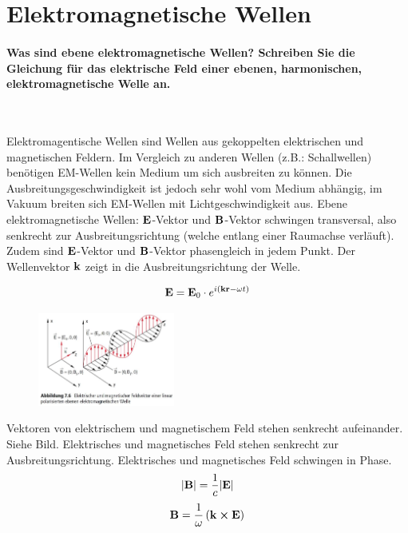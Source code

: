 \documentclass[a4paper, 11pt, ngerman, parskip=half-]{scrartcl}
\begin{document}
\newpage

\section{Elektromagnetische Wellen}

\paragraph{Was sind ebene elektromagnetische Wellen? Schreiben Sie die Gleichung für das elektrische
    Feld einer ebenen, harmonischen, elektromagnetische Welle an.} ~

Elektromagentische Wellen sind Wellen aus gekoppelten elektrischen und magnetischen Feldern. Im Vergleich zu anderen Wellen (z.B.: Schallwellen) benötigen
EM-Wellen kein Medium um sich ausbreiten zu können. Die Ausbreitungsgeschwindigkeit ist jedoch sehr wohl vom Medium abhängig, im Vakuum breiten sich EM-Wellen mit Lichtgeschwindigkeit aus.
Ebene elektromagnetische Wellen: $\vb{E}$-Vektor und $\vb{B}$-Vektor schwingen transversal, also senkrecht zur Ausbreitungsrichtung (welche entlang einer Raumachse verläuft). Zudem sind $\vb{E}$-Vektor und $\vb{B}$-Vektor phasengleich in jedem Punkt. Der Wellenvektor $\vb{k}$ zeigt in die Ausbreitungsrichtung der Welle.

\begin{equation}
    \label{eq:emwelleallgemein}
    \vb{E} = \vb{E}_0 \cdot e^{i(\vb{kr} - \omega t)}
\end{equation}

\begin{figure}[H]
    \centering
    \includegraphics[width=0.4\textwidth]{image/13/4.png}
\end{figure}

Vektoren von elektrischem und magnetischem Feld stehen senkrecht aufeinander. Siehe Bild.
Elektrisches und magnetisches Feld stehen senkrecht zur Ausbreitungsrichtung. Elektrisches und
magnetisches Feld schwingen in Phase.
\begin{equation}
    \abs{\vb{B}} = \frac{1}{c} \abs{\vb{E}}
\end{equation}
\begin{equation}
    \vb{B} = \frac{1}{\omega} \left( \vb{k} \cross \vb{E} \right)
\end{equation}
\end{document}
